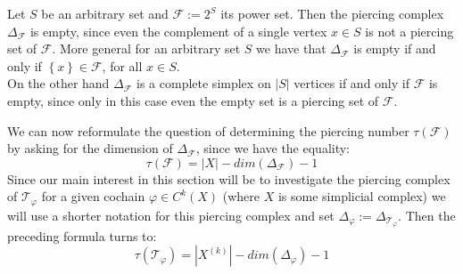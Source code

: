 \begin{expl}
Let \(S\) be an arbitrary set and \(\mathcal{F}:=2^S\) its power set. Then the piercing complex \(\Delta_{\mathcal{F}}\) is empty, since even the complement of a single vertex \(x\in S\) is not a piercing set of \(\mathcal{F}\). More general for an arbitrary set \(S\) we have that \(\Delta_{\mathcal{F}}\) is empty if and only if \(\left\{x\right\}\in\mathcal{F}\), for all \(x\in S\).\\
On the other hand \(\Delta_{\mathcal{F}}\) is a complete simplex on \(\left|S\right|\) vertices if and only if \(\mathcal{F}\) is empty, since only in this case even the empty set is a piercing set of \(\mathcal{F}\).
\end{expl}

We can now reformulate the question of determining the piercing number \(\tau(\mathcal{F})\) by asking for the dimension of \(\Delta_{\mathcal{F}}\), since we have the equality:
\[
\tau(\mathcal{F})=\left| X\right|-dim(\Delta_{\mathcal{F}})-1
\]
Since our main interest in this section will be to investigate the piercing complex of \(\mathcal{T}_{\varphi}\) for a given cochain \(\varphi\in C^k(X)\) (where \(X\) is some simplicial complex) we will use a shorter notation for this piercing complex and set \(\Delta_{\varphi}:=\Delta_{\mathcal{T}_{\varphi}}\). Then the preceding formula turns to:
\[
\tau(\mathcal{T}_{\varphi})=|X^{(k)}|-dim(\Delta_{\varphi})-1
\]



